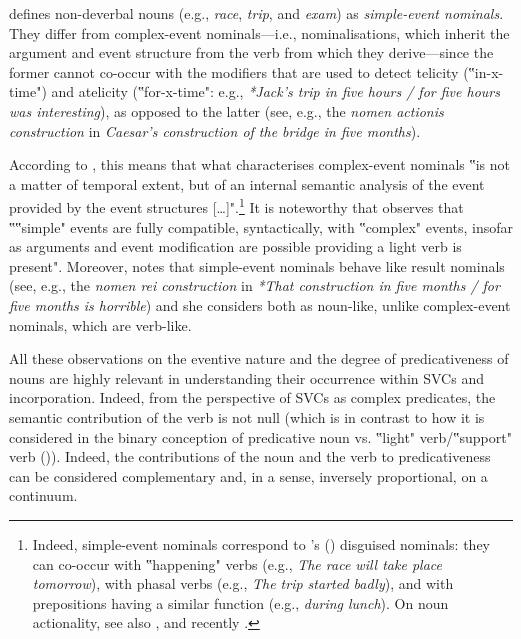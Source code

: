 \documentclass[output=paper,colorlinks,citecolor=brown]{langscibook}
\begin{document}
\citet[58--59]{Grimshaw1990} defines non-deverbal nouns (e.g., \textit{race}, \textit{trip}, and \textit{exam}) as \textit{simple-event nominals}. They differ from complex-event nominals---i.e., nominalisations, which inherit the argument and event structure from the verb from which they derive---since the former cannot co-occur with the modifiers that are used to detect telicity (‟in-x-time") and atelicity (‟for-x-time": e.g., \textit{*Jack's trip in five hours / for five hours was interesting}), as opposed to the latter (see, e.g., the \textit{nomen actionis construction} in \textit{Caesar’s construction of the bridge in five months}). 


According to \citet[59]{Grimshaw1990}, this means that what characterises complex-event nominals ‟is not a matter of temporal extent, but of an internal semantic analysis of the event provided by the event structures [\ldots{}]".\footnote{Indeed, \citet{Grimshaw1990} simple-event nominals correspond to \citeauthor{Vendler1967}'s (\citeyear{Vendler1967}) disguised nominals: they can co-occur with ‟happening" verbs (e.g., \textit{The race will take place tomorrow}), with phasal verbs (e.g., \textit{The trip started badly}), and with prepositions having a similar function (e.g., \textit{during lunch}). On noun actionality, see also \citet{Simone2003}, and recently \citet{PompeiTorino}.} It is noteworthy that \citet[56]{Borer2013} observes that ‟‟simple" events are fully compatible, syntactically, with ‟complex" events, insofar as arguments and event modification are possible providing a light verb is present". Moreover, \citet[50--59]{Grimshaw1990} notes that simple-event nominals behave like result nominals (see, e.g., the \textit{nomen rei construction} in \textit{*That construction in five months / for five months is horrible}) and she considers both as noun-like, unlike complex-event nominals, which are verb-like. 

All these observations on the eventive nature and the degree of predicativeness of nouns are highly relevant in understanding their occurrence within SVCs and incorporation. Indeed, from the perspective of SVCs as complex predicates, the semantic contribution of the verb is not null (which is in contrast to how it is considered in the binary conception of predicative noun vs. ‟light" verb/‟support" verb ()). Indeed, the contributions of the noun and the verb to predicativeness can be considered complementary and, in a sense, inversely proportional, on a continuum.
\end{document}
